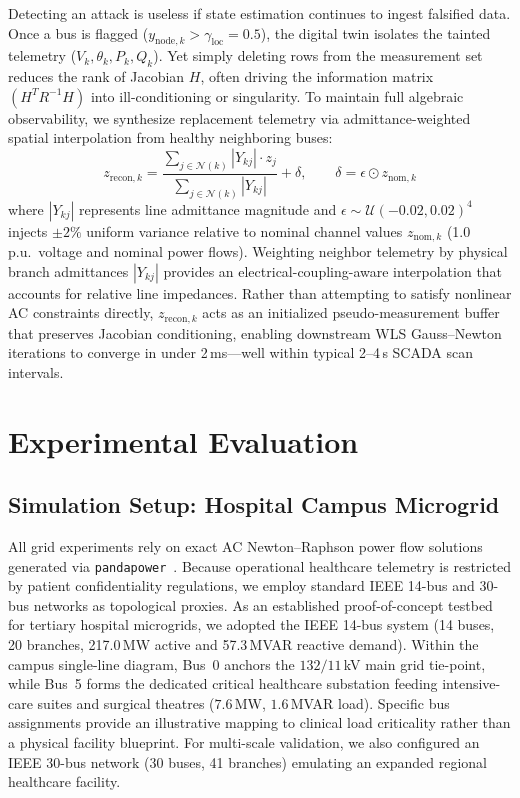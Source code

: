 \documentclass[runningheads]{llncs}
\begin{document}
Detecting an attack is useless if state estimation continues to ingest falsified data.
Once a bus is flagged ($y_{\mathrm{node},k} > \gamma_{\mathrm{loc}} = 0.5$), the digital twin isolates the tainted telemetry ($V_{k}, \theta_{k}, P_{k}, Q_{k}$).
Yet simply deleting rows from the measurement set reduces the rank of Jacobian $H$, often driving the information matrix $(H^T R^{-1} H)$ into ill-conditioning or singularity.
To maintain full algebraic observability, we synthesize replacement telemetry via admittance-weighted spatial interpolation from healthy neighboring buses:
\begin{equation}
z_{\mathrm{recon},k} = \frac{\sum_{j \in \mathcal{N}(k)} |Y_{kj}| \cdot z_{j}}{\sum_{j \in \mathcal{N}(k)} |Y_{kj}|} + \delta, \qquad \delta = \epsilon \odot z_{\mathrm{nom},k}
\label{eq:recon}
\end{equation}
where $|Y_{kj}|$ represents line admittance magnitude and $\epsilon \sim \mathcal{U}(-0.02, 0.02)^{4}$ injects $\pm 2\%$ uniform variance relative to nominal channel values $z_{\mathrm{nom},k}$ (1.0\,p.u.\ voltage and nominal power flows).
Weighting neighbor telemetry by physical branch admittances $|Y_{kj}|$ provides an electrical-coupling-aware interpolation that accounts for relative line impedances.
Rather than attempting to satisfy nonlinear AC constraints directly, $z_{\mathrm{recon},k}$ acts as an initialized pseudo-measurement buffer that preserves Jacobian conditioning, enabling downstream WLS Gauss--Newton iterations to converge in under 2\,ms---well within typical 2--4\,s SCADA scan intervals.

\section{Experimental Evaluation}
\label{sec:experiments}

\subsection{Simulation Setup: Hospital Campus Microgrid}

All grid experiments rely on exact AC Newton--Raphson power flow solutions generated via \texttt{pandapower}~\cite{thurner2018pandapower}.
Because operational healthcare telemetry is restricted by patient confidentiality regulations, we employ standard IEEE 14-bus and 30-bus networks as topological proxies.
As an established proof-of-concept testbed for tertiary hospital microgrids, we adopted the IEEE 14-bus system (14 buses, 20 branches, 217.0\,MW active and 57.3\,MVAR reactive demand).
Within the campus single-line diagram, Bus~0 anchors the $132/11$\,kV main grid tie-point, while Bus~5 forms the dedicated critical healthcare substation feeding intensive-care suites and surgical theatres ($7.6$\,MW, $1.6$\,MVAR load).
Specific bus assignments provide an illustrative mapping to clinical load criticality rather than a physical facility blueprint.
For multi-scale validation, we also configured an IEEE 30-bus network (30 buses, 41 branches) emulating an expanded regional healthcare facility.
\end{document}
